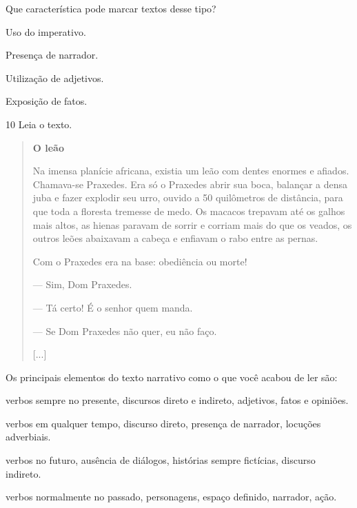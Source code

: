 Que característica pode marcar textos desse tipo?

\begin{escolha}
\item Uso do imperativo.

\item Presença de narrador.

\item Utilização de adjetivos.

\item Exposição de fatos.
\end{escolha}


\num{10} Leia o texto.

\begin{quote}
\textbf{O leão}

Na imensa planície africana, existia um leão com dentes enormes e
afiados. Chamava-se Praxedes. Era só o Praxedes abrir sua boca, balançar
a densa juba e fazer explodir seu urro, ouvido a 50 quilômetros de
distância, para que toda a floresta tremesse de medo. Os macacos
trepavam até os galhos mais altos, as hienas paravam de sorrir e corriam
mais do que os veados, os outros leões abaixavam a cabeça e enfiavam o
rabo entre as pernas.

Com o Praxedes era na base: obediência ou morte!

--- Sim, Dom Praxedes.

--- Tá certo! É o senhor quem manda.

--- Se Dom Praxedes não quer, eu não faço.

{[}...{]}

\end{quote}

Os principais elementos do texto narrativo como o que você acabou de ler
são:

\begin{escolha}
\item verbos sempre no presente, discursos direto e indireto, adjetivos, fatos e opiniões.

\item verbos em qualquer tempo, discurso direto, presença de narrador, locuções adverbiais.

\item verbos no futuro, ausência de diálogos, histórias sempre fictícias, discurso indireto.

\item verbos normalmente no passado, personagens, espaço definido, narrador, ação.
\end{escolha}


